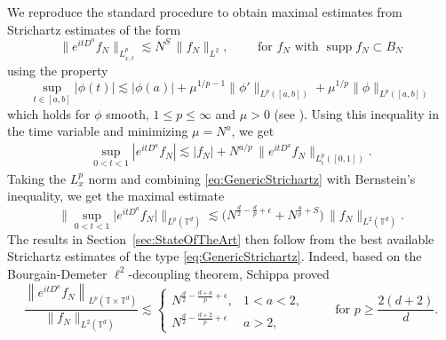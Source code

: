 \documentclass[11pt,reqno]{amsart}
\theoremstyle{definition}
\numberwithin{equation}{section}
\theoremstyle{remark}
\begin{document}
We reproduce the standard procedure to obtain maximal estimates from Strichartz estimates of the form 
\begin{equation}\label{eq:GenericStrichartz}
    \lVert e^{itD^a} f_N \rVert_{L^p_{x,t}} \lesssim N^{S} \, \lVert f_N \rVert_{L^2}, 
    \qquad \text{ for } f_N \text{ with } \operatorname{supp}f_N \subset B_N
\end{equation}
using the property
\begin{equation}\label{eq:LeeLemma}
        \sup_{t\in [a,b]} |\phi(t)| \lesssim |\phi(a)| + \mu^{1/p - 1} \lVert \phi' \rVert_{L^p([a,b])} + \mu^{1/p} \lVert \phi \rVert_{L^p([a,b])}
\end{equation}
which holds for $\phi$ smooth, $1 \leq p \leq \infty$ and $\mu > 0$ (see \cite[Lemma 2.5]{Lee2006}).
Using this inequality in the time variable and minimizing $\mu = N^a$,
we get
\begin{equation}
    \begin{split}
        \sup_{0<t<1} |e^{itD^a}f_N| 
        \lesssim 
        |f_N| + N^{a/p} \, \lVert e^{itD^a}f_N \rVert_{L^p_t([0,1])}. 
    \end{split}
\end{equation}
Taking the $L^p_x$ norm and combining \eqref{eq:GenericStrichartz} with Bernstein's inequality, we get the maximal estimate
\begin{equation}\label{eq:MaximalWhen_a<2}
    \Big\lVert \sup_{0<t<1} \big| e^{itD^a}f_N \big| \Big\rVert_{L^p( \mathbb T^d)}
    \lesssim \Big( N^{\frac{d}{2} - \frac{d}{p} + \epsilon} + N^{\frac{a}{p} + S} \Big)\, \lVert f_N \rVert_{L^2(\mathbb T^d)}.
\end{equation}
The results in Section~\ref{sec:StateOfTheArt} then follow from the best available Strichartz estimates of the type \eqref{eq:GenericStrichartz}. 
Indeed, based on the Bourgain-Demeter $\ell^2$-decoupling theorem, Schippa \cite{Schippa2020} proved 
\begin{equation}\label{eq:StrichartzEstimatesFractionalBest}
    \frac{\left\lVert e^{itD^a} f_N  \right\rVert_{L^p(\mathbb T \times \mathbb T^d)}}{\lVert f_N \rVert_{L^2(\mathbb T^d)}} 
    \lesssim 
    \left\{
    \begin{array}{ll}
      N^{\frac{d}{2} - \frac{d+a}{p} + \epsilon},   &  1 < a < 2, \\
      N^{\frac{d}{2} - \frac{d+2}{p} + \epsilon}   &  a > 2, 
    \end{array}
    \right.
    \qquad \text{ for } p \geq \frac{2(d+2)}{d}.
\end{equation}    
\end{document}
